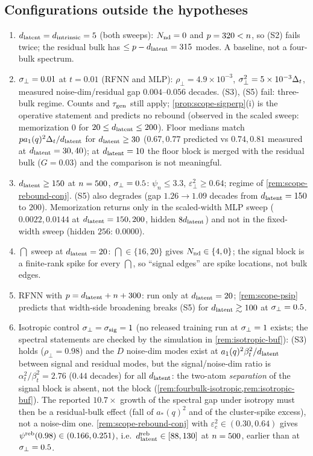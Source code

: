 \subsection{Configurations outside the hypotheses}
\label{app:theory-outside}

\begin{remark}\label{rem:scope-outside}
\begin{enumerate}
\item $d_{\mathrm{latent}}=d_{\mathrm{intrinsic}}=5$ (both sweeps): $N_{\rm nd}=0$ and $p=320<n$, so (S2) fails twice; the residual bulk has $\le p-d_{\mathrm{latent}}=315$ modes. A baseline, not a four-bulk spectrum.
\item $\sigma_{\perp}=0.01$ at $t=0.01$ (RFNN and MLP): $\rho_\perp=4.9\times10^{-3}$, $\sigma_{\perp}^2=5\times10^{-3}\Delta_t$, measured noise-dim/residual gap $0.004$--$0.056$ decades. (S3), (S5) fail: three-bulk regime. Counts and $\tau_{\mathrm{gen}}$ still apply; \cref{prop:scope-sigperp}(i) is the operative statement and predicts no rebound (observed in the scaled sweep: memorization $0$ for $20\le d_{\mathrm{latent}}\le200$). Floor medians match $p a_1(q)^2\Delta_t/d_{\mathrm{latent}}$ for $d_{\mathrm{latent}}\ge30$ ($0.67,0.77$ predicted vs $0.74,0.81$ measured at $d_{\mathrm{latent}}=30,40$); at $d_{\mathrm{latent}}=10$ the floor block is merged with the residual bulk ($G=0.03$) and the comparison is not meaningful.
\item $d_{\mathrm{latent}}\ge150$ at $n=500$, $\sigma_{\perp}=0.5$: $\psi_n\le3.3$, $\varepsilon_\perp^2\ge0.64$; regime of \cref{rem:scope-rebound-conj}. (S5) also degrades (gap $1.26\to1.09$ decades from $d_{\mathrm{latent}}=150$ to $200$). Memorization returns only in the scaled-width MLP sweep ($0.0022,0.0144$ at $d_{\mathrm{latent}}=150,200$, hidden $8d_{\mathrm{latent}}$) and not in the fixed-width sweep (hidden $256$: $0.0000$).
\item $\dint$ sweep at $d_{\mathrm{latent}}=20$: $\dint\in\{16,20\}$ gives $N_{\rm nd}\in\{4,0\}$; the signal block is a finite-rank spike for every $\dint$, so ``signal edges'' are spike locations, not bulk edges.
\item RFNN with $p=d_{\mathrm{latent}}+n+300$: run only at $d_{\mathrm{latent}}=20$; \cref{rem:scope-psip} predicts that width-side broadening breaks (S5) for $d_{\mathrm{latent}}\gtrsim100$ at $\sigma_{\perp}=0.5$.
\item Isotropic control $\sigma_{\perp}=\sigma_{\mathrm{sig}}=1$ (no released training run at $\sigma_{\perp}=1$ exists; the spectral statements are checked by the simulation in \cref{rem:isotropic-buf}): (S3) holds ($\rho_\perp=0.98$) and the $D$ noise-dim modes exist at $a_1(q)^2\beta_t^2/d_{\mathrm{latent}}$ between signal and residual modes, but the signal/noise-dim ratio is $\alpha_t^2/\beta_t^2=2.76$ ($0.44$ decades) for all $d_{\mathrm{latent}}$: the two-atom \emph{separation} of the signal block is absent, not the block (\cref{rem:fourbulk-isotropic,rem:isotropic-buf}). The reported $10.7\times$ growth of the spectral gap under isotropy must then be a residual-bulk effect (fall of $a_*(q)^2$ and of the cluster-spike excess), not a noise-dim one. \cref{rem:scope-rebound-conj} with $\varepsilon_c^2\in(0.30,0.64)$ gives $\psi^{\rm reb}(0.98)\in(0.166,0.251)$, i.e.\ $d_{\mathrm{latent}}^{\rm reb}\in[88,130]$ at $n=500$, earlier than at $\sigma_{\perp}=0.5$.

\end{enumerate}
\end{remark}
